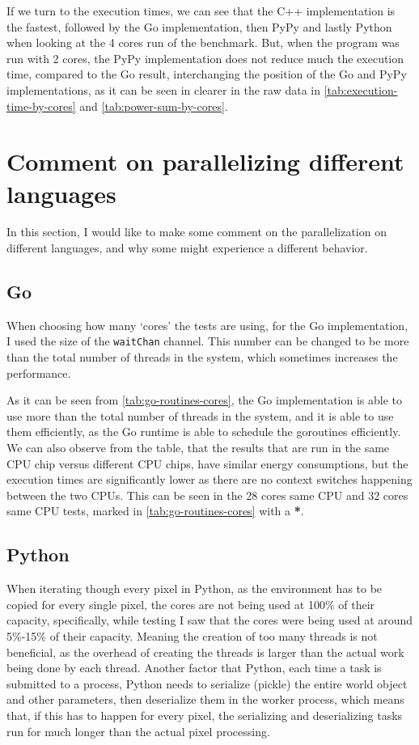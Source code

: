 If we turn to the execution times, we can see that the C++ implementation is the fastest, followed by the Go implementation, then PyPy and lastly Python when looking at the 4 cores run of the benchmark. But, when the program was run with 2 cores, the PyPy implementation does not reduce much the execution time, compared to the Go result, interchanging the position of the Go and PyPy implementations, as it can be seen in clearer in the raw data in \autoref{tab:execution-time-by-cores} and \autoref{tab:power-sum-by-cores}.

\section{Comment on parallelizing different languages}

In this section, I would like to make some comment on the parallelization on different languages, and why some might experience a different behavior. 

\subsection{Go}
When choosing how many `cores' the tests are using, for the Go implementation, I used the size of the \texttt{waitChan} channel. This number can be changed to be more than the total number of threads in the system, which sometimes increases the performance.



As it can be seen from \autoref{tab:go-routines-cores}, the Go implementation is able to use more than the total number of threads in the system, and it is able to use them efficiently, as the Go runtime is able to schedule the goroutines efficiently. We can also observe from the table, that the results that are run in the same CPU chip versus different CPU chips, have similar energy consumptions, but the execution times are significantly lower as there are no context switches happening between the two CPUs. This can be seen in the 28 cores same CPU and 32 cores same CPU tests, marked in \autoref{tab:go-routines-cores} with a \textbf{*}.

\subsection{Python}
When iterating though every pixel in Python, as the environment has to be copied for every single pixel, the cores are not being used at 100\% of their capacity, specifically, while testing I saw that the cores were being used at around 5\%-15\% of their capacity. Meaning the creation of too many threads is not beneficial, as the overhead of creating the threads is larger than the actual work being done by each thread. 
Another factor that Python, each time a task is submitted to a process, Python needs to serialize (pickle) the entire world object and other parameters, then deserialize them in the worker process, which means that, if this has to happen for every pixel, the serializing and deserializing tasks run for much longer than the actual pixel processing.

